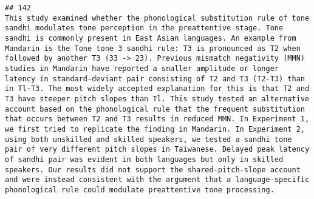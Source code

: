\documentclass[
  english,
  man]{apa6}
\begin{document}
\begin{verbatim}
## 142                                                                                                                                                                                                                                                                                                                                                                                                                                                                                                                                                                                                                                                                                                                                                                                                                                                                                                                                                                                                                                                                                                                                                                                                                                                                                                                                                                                      This study examined whether the phonological substitution rule of tone sandhi modulates tone perception in the preattentive stage. Tone sandhi is commonly present in East Asian languages. An example from Mandarin is the Tone tone 3 sandhi rule: T3 is pronounced as T2 when followed by another T3 (33 -> 23). Previous mismatch negativity (MMN) studies in Mandarin have reported a smaller amplitude or longer latency in standard-deviant pair consisting of T2 and T3 (T2-T3) than in Tl-T3. The most widely accepted explanation for this is that T2 and T3 have steeper pitch slopes than Tl. This study tested an alternative account based on the phonological rule that the frequent substitution that occurs between T2 and T3 results in reduced MMN. In Experiment 1, we first tried to replicate the finding in Mandarin. In Experiment 2, using both unskilled and skilled speakers, we tested a sandhi tone pair of very different pitch slopes in Taiwanese. Delayed peak latency of sandhi pair was evident in both languages but only in skilled speakers. Our results did not support the shared-pitch-slope account and were instead consistent with the argument that a language-specific phonological rule could modulate preattentive tone processing.

\end{verbatim}
\end{document}
